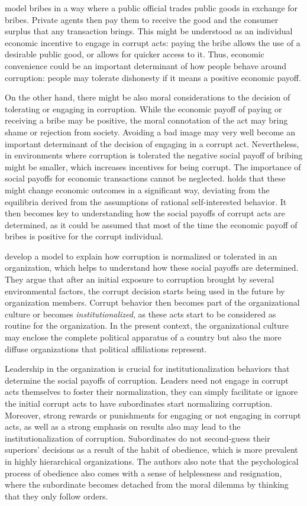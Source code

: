\documentclass[12pt,a4]{article}\usepackage[]{graphicx}\usepackage[]{xcolor}
\begin{document}
\textcite{Shleifer.1993} model bribes in a way where a public official trades public goods in exchange for bribes. Private agents then pay them to receive the good and the consumer surplus that any transaction brings. This might be understood as an individual economic incentive to engage in corrupt acts: paying the bribe allows the use of a desirable public good, or allows for quicker access to it. Thus, economic convenience could be an important determinant of how people behave around corruption: people may tolerate dishonesty if it means a positive economic payoff. 

On the other hand, there might be also moral considerations to the decision of tolerating or engaging in corruption. While the economic payoff of paying or receiving a bribe may be positive, the moral connotation of the act may bring shame or rejection from society. Avoiding a bad image may very well become an important determinant of the decision of engaging in a corrupt act. Nevertheless, in environments where corruption is tolerated the negative social payoff of bribing might be smaller, which increases incentives for being corrupt. The importance of social payoffs for economic transactions cannot be neglected. \textcite{Akerlof.1980} holds that these might change economic outcomes in a significant way, deviating from the equilibria derived from the assumptions of rational self-interested behavior. It then becomes key to understanding how the social payoffs of corrupt acts are determined, as it could be assumed that most of the time the economic payoff of bribes is positive for the corrupt individual. 

\textcite{Ashforth.2003} develop a model to explain how corruption is normalized or tolerated in an organization, which helps to understand how these social payoffs are determined. They argue that after an initial exposure to corruption brought by several environmental factors, the corrupt decision starts being used in the future by organization members. Corrupt behavior then becomes part of the organizational culture or becomes \textit{institutionalized}, as these acts start to be considered as routine for the organization. In the present context, the organizational culture may enclose the complete political apparatus of a country but also the more diffuse organizations that political affiliations represent. 

Leadership in the organization is crucial for institutionalization behaviors that determine the social payoffs of corruption. Leaders need not engage in corrupt acts themselves to foster their normalization, they can simply facilitate or ignore the initial corrupt acts to have subordinates start normalizing corruption. Moreover, strong rewards or punishments for engaging or not engaging in corrupt acts, as well as a strong emphasis on results also may lead to the institutionalization of corruption. Subordinates do not second-guess their superiors' decisions as a result of the habit of obedience, which is more prevalent in highly hierarchical organizations. The authors also note that the psychological process of obedience also comes with a sense of helplessness and resignation, where the subordinate becomes detached from the moral dilemma by thinking that they only follow orders. 
\end{document}
